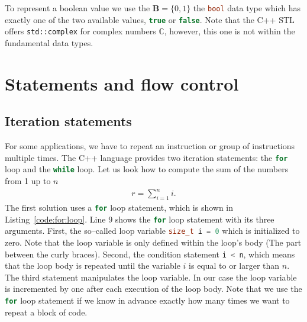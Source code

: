 To represent a boolean value we use the $\mathbf{B}=\{0,1\}$ the \lstinline[language=C++]|bool| data type which has exactly one of the two available values, \lstinline[language=C++]|true| or \lstinline[language=C++]|false|. Note that the C++ STL offers \lstinline|std::complex| for complex numbers $\mathbb{C}$, however, this one is not within the fundamental data types.

\section{Statements and flow control}

\subsection{Iteration statements}
\label{sec:iteration:statements}
 For some applications, we have to repeat an instruction or group of instructions multiple times. The C++ language provides two iteration statements: the \lstinline[language=C++]|for| loop and the \lstinline[language=C++]|while| loop. Let us look how to compute the sum of the numbers from 1 up to $n$
\begin{align}
r = \sum\limits_{i=1}^n i\text{.}
\end{align}
The first solution uses a \lstinline[language=C++]|for| loop statement, which is shown in Listing~\ref{code:for:loop}. Line 9 shows the \lstinline[language=C++]|for| loop statement with its three arguments. First, the so--called loop variable \lstinline[language=C++]{size_t i = 0} which is initialized to zero. Note that the loop variable is only defined within the loop's body (The part between the curly braces). Second, the condition statement \lstinline[language=C++]{i < n}, which means that the loop body is repeated until the variable $i$ is equal to or larger than $n$. The third statement manipulates the loop variable. In our case the loop variable is incremented by one after each execution of the loop body. Note that we use the \lstinline[language=C++]|for| loop statement if we know in advance exactly how many times we want to repeat a block of code.


